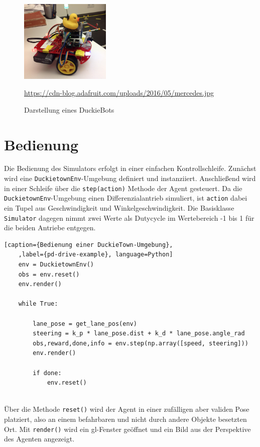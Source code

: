 \begin{figure}[H]
	\centering
	\includegraphics[width=0.385\textwidth]{kapitel2/images/duckiebot.jpg}
	\label{fig:duckiebot}
	\caption{Darstellung eines DuckieBots}
	\vspace{0.2cm}
	\quelle\url{https://cdn-blog.adafruit.com/uploads/2016/05/mercedes.jpg}
\end{figure}


\section{Bedienung}

Die Bedienung des Simulators erfolgt in einer einfachen Kontrollschleife. Zunächst wird eine \texttt{DuckietownEnv}-Umgebung definiert und instanziiert. Anschließend wird in einer Schleife über die \texttt{step(action)} Methode der Agent gesteuert. Da die  \texttt{DuckietownEnv}-Umgebung einen Differenzialantrieb simuliert, ist \texttt{action} dabei ein Tupel aus Geschwindigkeit und Winkelgeschwindigkeit. Die Basisklasse \texttt{Simulator} dagegen nimmt zwei Werte als Dutycycle im Wertebereich -1 bis 1 für die beiden Antriebe entgegen.

\begin{minipage}{\linewidth}
	\begin{lstlisting}[caption={Bedienung einer DuckieTown-Umgebung},
	,label={pd-drive-example}, language=Python]
	env = DuckietownEnv()
	obs = env.reset()
	env.render()
	
	while True:
		
		lane_pose = get_lane_pos(env)
		steering = k_p * lane_pose.dist + k_d * lane_pose.angle_rad
		obs,reward,done,info = env.step(np.array([speed, steering]))
		env.render()
		
		if done:
			env.reset()
	
	\end{lstlisting}
\end{minipage}

Über die Methode \texttt{reset()} wird der Agent in einer zufälligen aber validen Pose platziert, also an einem befahrbaren und nicht durch andere Objekte besetzten Ort. Mit \texttt{render()} wird ein \acs{gl}-Fenster geöffnet und ein Bild aus der Perspektive des Agenten angezeigt.\\

